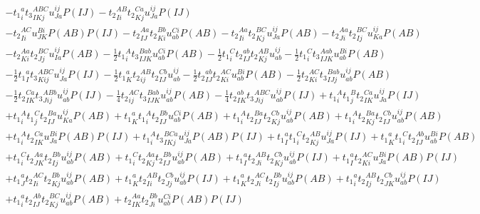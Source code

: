 \begin{gather*}
- {t_1}^{a}_{i} {t_3}^{ABC}_{IKj} u^{ij}_{Ja} P(IJ)
- {t_2}^{AB}_{Ii} {t_2}^{Ca}_{Kj} u^{ij}_{Ja} P(IJ) \\
- {t_2}^{AC}_{Ii} u^{Bi}_{JK} P(AB) P(IJ)
- {t_2}^{Aa}_{IJ} {t_2}^{Bb}_{Ki} u^{Ci}_{ab} P(AB)
- {t_2}^{Aa}_{Ii} {t_2}^{BC}_{Kj} u^{ij}_{Ja} P(AB)
- {t_2}^{Aa}_{Ji} {t_2}^{BC}_{Ij} u^{ij}_{Ka} P(AB) \\
- {t_2}^{Aa}_{Ki} {t_2}^{BC}_{Jj} u^{ij}_{Ia} P(AB)
- \frac{1}{2}{t_1}^{A}_{i} {t_3}^{Bab}_{IJK} u^{Ci}_{ab} P(AB)
- \frac{1}{2}{t_1}^{C}_{i} {t_2}^{ab}_{IJ} {t_2}^{AB}_{Kj} u^{ij}_{ab}
- \frac{1}{2}{t_1}^{C}_{i} {t_3}^{Aab}_{IJK} u^{Bi}_{ab} P(AB) \\
- \frac{1}{2}{t_1}^{a}_{I} {t_3}^{ABC}_{Kij} u^{ij}_{Ja} P(IJ)
- \frac{1}{2}{t_1}^{a}_{K} {t_2}^{AB}_{ij} {t_2}^{Cb}_{IJ} u^{ij}_{ab}
- \frac{1}{2}{t_2}^{ab}_{IJ} {t_2}^{AC}_{Ki} u^{Bi}_{ab} P(AB)
- \frac{1}{2}{t_2}^{AC}_{Ki} {t_3}^{Bab}_{IJj} u^{ij}_{ab} P(AB) \\
- \frac{1}{2}{t_2}^{Ca}_{IK} {t_3}^{ABb}_{Jij} u^{ij}_{ab} P(IJ)
- \frac{1}{4}{t_2}^{AC}_{ij} {t_3}^{Bab}_{IJK} u^{ij}_{ab} P(AB)
- \frac{1}{4}{t_2}^{ab}_{IK} {t_3}^{ABC}_{Jij} u^{ij}_{ab} P(IJ)
+ {t_1}^{A}_{i} {t_1}^{B}_{j} {t_2}^{Ca}_{IK} u^{ij}_{Ja} P(IJ) \\
+ {t_1}^{A}_{i} {t_1}^{C}_{j} {t_2}^{Ba}_{IJ} u^{ij}_{Ka} P(AB)
+ {t_1}^{a}_{K} {t_1}^{A}_{i} {t_2}^{Bb}_{IJ} u^{Ci}_{ab} P(AB)
+ {t_1}^{A}_{i} {t_2}^{Ba}_{IJ} {t_2}^{Cb}_{Kj} u^{ij}_{ab} P(AB)
+ {t_1}^{A}_{i} {t_2}^{Ba}_{Kj} {t_2}^{Cb}_{IJ} u^{ij}_{ab} P(AB) \\
+ {t_1}^{A}_{i} {t_2}^{Ca}_{IK} u^{Bi}_{Ja} P(AB) P(IJ)
+ {t_1}^{A}_{i} {t_3}^{BCa}_{IKj} u^{ij}_{Ja} P(AB) P(IJ)
+ {t_1}^{a}_{I} {t_1}^{C}_{i} {t_2}^{AB}_{Kj} u^{ij}_{Ja} P(IJ)
+ {t_1}^{a}_{K} {t_1}^{C}_{i} {t_2}^{Ab}_{IJ} u^{Bi}_{ab} P(AB) \\
+ {t_1}^{C}_{i} {t_2}^{Aa}_{JK} {t_2}^{Bb}_{Ij} u^{ij}_{ab} P(AB)
+ {t_1}^{C}_{i} {t_2}^{Aa}_{Kj} {t_2}^{Bb}_{IJ} u^{ij}_{ab} P(AB)
+ {t_1}^{a}_{I} {t_2}^{AB}_{Ji} {t_2}^{Cb}_{Kj} u^{ij}_{ab} P(IJ)
+ {t_1}^{a}_{I} {t_2}^{AC}_{Ki} u^{Bi}_{Ja} P(AB) P(IJ) \\
+ {t_1}^{a}_{J} {t_2}^{AC}_{Ii} {t_2}^{Bb}_{Kj} u^{ij}_{ab} P(AB)
+ {t_1}^{a}_{K} {t_2}^{AB}_{Ii} {t_2}^{Cb}_{Jj} u^{ij}_{ab} P(IJ)
+ {t_1}^{a}_{K} {t_2}^{AC}_{Ji} {t_2}^{Bb}_{Ij} u^{ij}_{ab} P(AB)
+ {t_1}^{a}_{i} {t_2}^{AB}_{Ij} {t_2}^{Cb}_{JK} u^{ij}_{ab} P(IJ) \\
+ {t_1}^{a}_{i} {t_2}^{Ab}_{IJ} {t_2}^{BC}_{Kj} u^{ij}_{ab} P(AB)
+ {t_2}^{Aa}_{IK} {t_2}^{Bb}_{Ji} u^{Ci}_{ab} P(AB) P(IJ)

\end{gather*}
